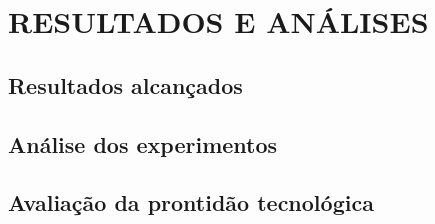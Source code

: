\chapter{RESULTADOS E ANÁLISES}
\label{chap:result}


\section{Resultados alcançados}
\label{sec:resalcanc}


\section{Análise dos experimentos}
\label{sec:doe}


\section{Avaliação da prontidão tecnológica}
\label{sec:trl}


